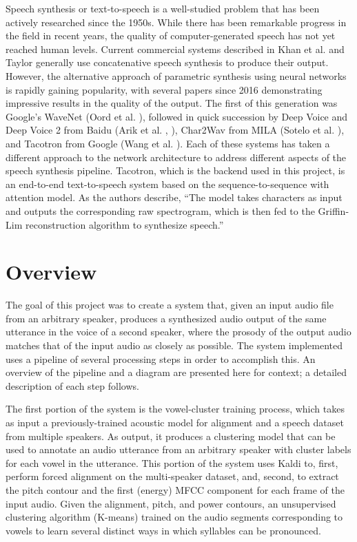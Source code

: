 \documentclass{article}
\begin{document}
Speech synthesis or text-to-speech is a well-studied problem that has been actively researched since the 1950s. While there has been remarkable progress in the field in recent years, the quality of computer-generated speech has not yet reached human levels. Current commercial systems described in Khan et al. \cite{khan2016concatenative} and Taylor  \cite{taylor2009text} generally use concatenative speech synthesis to produce their output. However, the alternative approach of parametric synthesis using neural networks is rapidly gaining popularity, with several papers since 2016 demonstrating impressive results in the quality of the output.
The first of this generation was Google's WaveNet (Oord et al. \cite{oord2016wavenet}), followed in quick succession by Deep Voice and Deep Voice 2 from Baidu (Arik et al. \cite{arik2017deep}, \cite{arik2017deep2}), Char2Wav from MILA (Sotelo et al. \cite{sotelo2017char2wav}), and Tacotron from Google (Wang et al. \cite{wang2017tacotron}).
Each of these systems has taken a different approach to the network architecture to address different aspects of the speech synthesis pipeline. Tacotron, which is the backend used in this project, is an end-to-end text-to-speech system based on the sequence-to-sequence with attention model. As the authors describe, ``The model takes characters as input and outputs the corresponding raw spectrogram, which is then fed to the Griffin-Lim reconstruction algorithm to synthesize speech.''

\section{Overview}
\label{sec:overview}
The goal of this project was to create a system that, given an input audio file from an arbitrary speaker, produces a synthesized audio output of the same utterance in the voice of a second speaker, where the prosody of the output audio matches that of the input audio as closely as possible.
The system implemented uses a pipeline of several processing steps in order to accomplish this.
An overview of the pipeline and a diagram are presented here for context; a detailed description of each step follows.

The first portion of the system is the vowel-cluster training process, which takes as input a previously-trained acoustic model for alignment and a speech dataset from multiple speakers. As output, it produces a clustering model that can be used to annotate an audio utterance from an arbitrary speaker with cluster labels for each vowel in the utterance. This portion of the system uses Kaldi to, first, perform forced alignment on the multi-speaker dataset, and, second, to extract the pitch contour and the first (energy) MFCC component for each frame of the input audio. Given the alignment, pitch, and power contours, an unsupervised clustering algorithm (K-means) trained on the audio segments corresponding to vowels to learn several distinct ways in which syllables can be pronounced.
\end{document}
